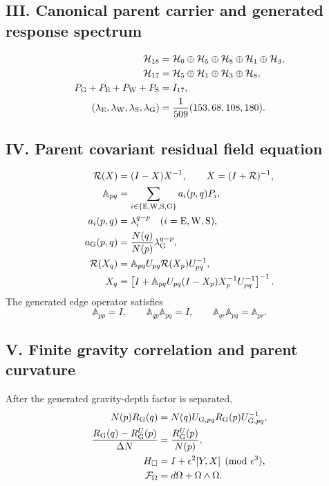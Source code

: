 \documentclass[11pt]{article}
\numberwithin{equation}{section}
\theoremstyle{remark}
\begin{document}
\subsection*{III. Canonical parent carrier and generated response spectrum}
\begin{align}
\mathcal H_{18}&=\mathcal H_0\oplus\mathcal H_5\oplus\mathcal H_8\oplus\mathcal H_1\oplus\mathcal H_3,\\
\mathcal H_{17}&=\mathcal H_5\oplus\mathcal H_1\oplus\mathcal H_3\oplus\mathcal H_8,\\
P_{\rm G}+P_{\rm E}+P_{\rm W}+P_{\rm S}&=I_{17},\\
(\lambda_{\rm E},\lambda_{\rm W},\lambda_{\rm S},\lambda_{\rm G})&=\frac1{509}(153,68,108,180).
\end{align}

\subsection*{IV. Parent covariant residual field equation}
\begin{align}
\mathcal R(X)&=(I-X)X^{-1},\qquad X=(I+\mathcal R)^{-1},\\
\mathbb A_{pq}&=\sum_{i\in\{{\rm E,W,S,G}\}}a_i(p,q)P_i,\\
a_i(p,q)&=\lambda_i^{q-p}\quad(i={\rm E,W,S}),\\
a_{\rm G}(p,q)&=\frac{N(q)}{N(p)}\lambda_{\rm G}^{q-p},\\
\mathcal R(X_q)&=\mathbb A_{pq}U_{pq}\mathcal R(X_p)U_{pq}^{-1},\\
X_q&=\left[I+\mathbb A_{pq}U_{pq}(I-X_p)X_p^{-1}U_{pq}^{-1}\right]^{-1}.
\end{align}
The generated edge operator satisfies
\begin{equation}
\mathbb A_{pp}=I,\qquad \mathbb A_{qp}\mathbb A_{pq}=I,\qquad \mathbb A_{qr}\mathbb A_{pq}=\mathbb A_{pr}.
\end{equation}

\subsection*{V. Finite gravity correlation and parent curvature}
After the generated gravity-depth factor is separated,
\begin{align}
N(p)R_{\rm G}(q)&=N(q)U_{{\rm G},pq}R_{\rm G}(p)U_{{\rm G},pq}^{-1},\\
\frac{R_{\rm G}(q)-R_{\rm G}^{U}(p)}{\Delta N}&=\frac{R_{\rm G}^{U}(p)}{N(p)},\\
H_{\square}&=I+\epsilon^2[Y,X]\pmod{\epsilon^3},\\
\mathcal F_{\Omega}&=d\Omega+\Omega\wedge\Omega.
\end{align}
\end{document}
